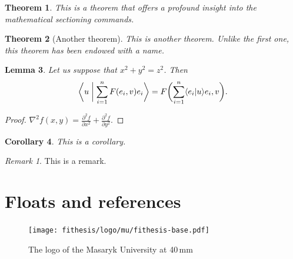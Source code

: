 \documentclass[
  digital, %
  table,   %
  lof,     %
  lot,     %
]{fithesis3}
\begin{document}
\newtheorem{theorem}{Theorem}[section] %
\newtheorem{lemma}[theorem]{Lemma}         %
\newtheorem{corollary}[theorem]{Corollary} %
\theoremstyle{definition}
\newtheorem{definition}{Definition}
\theoremstyle{remark}
\newtheorem*{remark}{Remark}

\begin{theorem}
  This is a theorem that offers a profound insight into the
  mathematical sectioning commands.
\end{theorem}
\begin{theorem}[Another theorem]
  This is another theorem. Unlike the first one, this theorem has
  been endowed with a name.
\end{theorem}
\begin{lemma}
  Let us suppose that $x^2+y^2=z^2$. Then
  \begin{equation}
    \biggl\langle u\biggm|\sum_{i=1}^nF(e_i,v)e_i\biggr\rangle
    =F\biggl(\sum_{i=1}^n\langle e_i|u\rangle e_i,v\biggr).
  \end{equation}
\end{lemma}
\begin{proof}
  $\nabla^2 f(x,y)=\frac{\partial^2f}{\partial x^2}+
   \frac{\partial^2f}{\partial y^2}$.
\end{proof}
\begin{corollary}
  This is a corollary.
\end{corollary}
\begin{remark}
  This is a remark.
\end{remark}

\chapter{Floats and references}
\begin{figure}
  \begin{center}
    \texttt{[image: fithesis/logo/mu/fithesis-base.pdf]}
  \end{center}
  \caption{The logo of the Masaryk University at 40\,mm}
  \label{fig:mulogo1}
\end{figure}
\end{document}
